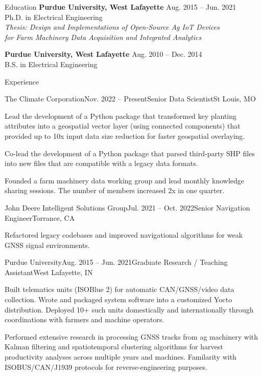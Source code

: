 \documentclass{resume}
\begin{document}
  \begin{rSection}{Education}
    {\bf Purdue University, West Lafayette} \hfill {Aug. 2015 -- Jun. 2021}
    \\ 
    {Ph.D. in Electrical Engineering} \\
    \textit{Thesis: Design and Implementations of Open-Source Ag IoT Devices \\
      for Farm Machinery Data Acquisition and Integrated Analytics}

    {\bf Purdue University, West Lafayette} \hfill {Aug. 2010 -- Dec. 2014}
    \\ 
    {B.S. in Electrical Engineering} \\
  \end{rSection}

  \begin{rSection}{Experience}
    \begin{rSubsection}{The Climate Corporation}{Nov. 2022 --
      Present}{Senior Data Scientist}{St Louis, MO}
      \item Lead the development of a Python package that transformed key
        planting attributes into a geospatial vector layer (using connected
        components) that provided up to 10x input data size reduction for
        faster geospatial overlaying.
      \item Co-lead the development of a Python package that parsed third-party
        SHP files into new files that are compatible with a legacy data formats.
      \item Founded a farm machinery data working group and lead monthly
        knowledge sharing sessions. The number of members increased 2x in one
        quarter. 
    \end{rSubsection}

    \begin{rSubsection}{John Deere Intelligent Solutions Group}{Jul. 2021 --
      Oct. 2022}{Senior Navigation Engineer}{Torrance, CA}
      \item Refactored legacy codebases and improved navigational algorithms for
      weak GNSS signal environments. 
    \end{rSubsection}

    \begin{rSubsection}{Purdue University}{Aug. 2015 -- Jun. 2021}{Graduate
        Research / Teaching Assistant}{West Lafayette, IN}
      \item Built telematics units (ISOBlue 2) for automatic CAN/GNSS/video
        data collection. Wrote and packaged system software into a customized
        Yocto distribution. Deployed 10+ such units domestically and
        internationally through coordinations with farmers and machine
        operators.
      \item Performed extensive research in processing GNSS tracks from ag
        machinery with Kalman filtering and spatiotemporal clustering
        algorithms for harvest productivity analyses across multiple years and
        machines. Familarity with ISOBUS/CAN/J1939 protocols for
        reverse-engineering purposes. 
    \end{rSubsection}


\end{rSection}
\end{document}
